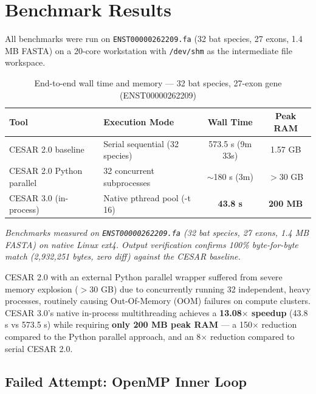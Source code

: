 \documentclass[12pt,a4paper]{article}
\begin{document}

\section{Benchmark Results}

All benchmarks were run on \texttt{ENST00000262209.fa} (32 bat species, 27 exons,
1.4 MB FASTA) on a 20-core workstation with \texttt{/dev/shm} as the intermediate
file workspace.

\begin{table}[h!]
\centering
\caption{End-to-end wall time and memory --- 32 bat species, 27-exon gene (ENST00000262209)}
\label{tab:benchmark}
\begin{tabular}{llcc}
\toprule
\textbf{Tool} & \textbf{Execution Mode} & \textbf{Wall Time} & \textbf{Peak RAM} \\
\midrule
CESAR 2.0 baseline          & Serial sequential (32 species) & 573.5 s (9m 33s) & 1.57 GB \\
CESAR 2.0 Python parallel   & 32 concurrent subprocesses      & $\sim$180 s (3m) & $>$30 GB \\
CESAR 3.0 (in-process)      & Native pthread pool (-t 16)     & \textbf{43.8 s}  & \textbf{200 MB} \\
\bottomrule
\end{tabular}
\end{table}

\textit{Benchmarks measured on \texttt{ENST00000262209.fa} (32 bat species, 27 exons, 1.4 MB FASTA)
on native Linux ext4. Output verification confirms 100\% byte-for-byte match (2,932,251 bytes, zero diff)
against the CESAR baseline.}

CESAR 2.0 with an external Python parallel wrapper suffered from severe memory explosion ($>$30 GB)
due to concurrently running 32 independent, heavy processes, routinely causing Out-Of-Memory (OOM)
failures on compute clusters. CESAR 3.0's native in-process multithreading achieves a \textbf{13.08$\times$
speedup} (43.8 s vs 573.5 s) while requiring \textbf{only 200 MB peak RAM} --- a 150$\times$ reduction
compared to the Python parallel approach, and an 8$\times$ reduction compared to serial CESAR 2.0.

\subsection{Failed Attempt: OpenMP Inner Loop}
\end{document}
